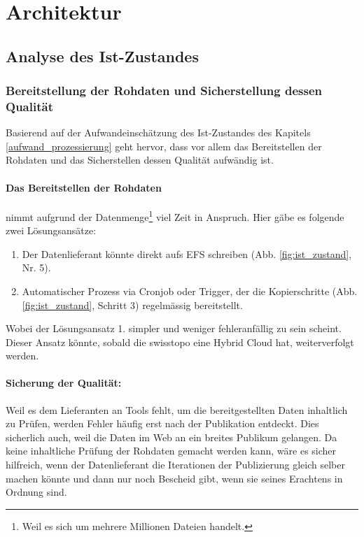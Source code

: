 \section{Architektur}

\subsection{Analyse des Ist-Zustandes}
\subsubsection{Bereitstellung der Rohdaten und Sicherstellung dessen Qualität}\label{kap:sicherstellung_qualitaet}
Basierend auf der Aufwandeinschätzung des Ist-Zustandes des Kapitels \ref{aufwand_prozessierung} geht hervor, dass vor allem das Bereitstellen der Rohdaten und das Sicherstellen dessen Qualität aufwändig ist. 

\paragraph{Das Bereitstellen der Rohdaten} nimmt aufgrund der Datenmenge\footnote{Weil es sich um mehrere Millionen Dateien handelt.} viel Zeit in Anspruch. Hier gäbe es folgende zwei Lösungsansätze:
\begin{enumerate}
\item Der Datenlieferant könnte direkt aufs EFS schreiben (Abb. \ref{fig:ist_zustand}, Nr. 5).
\item Automatischer Prozess via Cronjob oder Trigger, der die Kopierschritte (Abb. \ref{fig:ist_zustand}, Schritt 3) regelmässig bereitstellt.
\end{enumerate}

Wobei der Lösungsansatz 1. simpler und weniger fehleranfällig zu sein scheint. Dieser Ansatz könnte, sobald die swisstopo eine Hybrid Cloud hat, weiterverfolgt werden.

\paragraph{Sicherung der Qualität:} Weil es dem Lieferanten an Tools fehlt, um die bereitgestellten Daten inhaltlich zu Prüfen, werden Fehler 
häufig erst nach der Publikation entdeckt. Dies sicherlich auch, weil die Daten im Web an ein breites Publikum gelangen. Da keine inhaltliche Prüfung der Rohdaten gemacht werden kann, wäre es sicher hilfreich, wenn der Datenlieferant die Iterationen der Publizierung gleich selber machen könnte und dann nur noch Bescheid gibt, wenn sie seines Erachtens in Ordnung sind.

